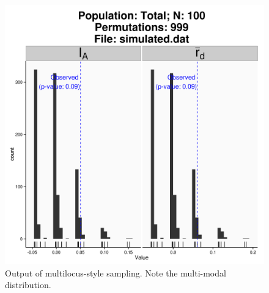 \documentclass[letterpaper]{article}
\begin{document}
\begin{figure}[h!]
  \centering
  \caption{\footnotesize Output of multilocus-style sampling. Note the multi-modal distribution.}
  \label{simulated_dist_fig}
  \includegraphics{simulated_dist_fig.png}
\end{figure}
\newpage
\end{document}
